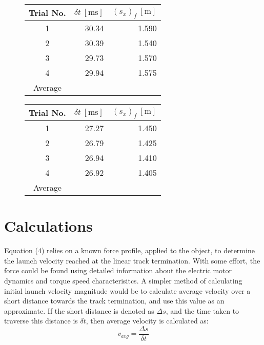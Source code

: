 \documentclass[a4paper]{article}
\begin{document}
\begin{figure}[h]
	\begin{minipage}{0.45\textwidth}
		\centering
		\begin{tabular}{crr}
			\toprule
			Trial No. & $\delta t \ [\si{\milli\second}]$ & $(s_x)_f \ [\si{\meter}]$\\
			\midrule
			1 & 30.34 & 1.590\\
			2 & 30.39 & 1.540\\
			3 & 29.73 & 1.570\\
			4 & 29.94 & 1.575\\
			\midrule
			Average & & \\
			\bottomrule
		\end{tabular}
	\end{minipage}
	\hspace{1cm}
	\begin{minipage}{0.45\textwidth}
		\centering
		\begin{tabular}{crr}
			\toprule
			Trial No. & $\delta t \ [\si{\milli\second}]$ & $(s_x)_f \ [\si{\meter}]$\\
			\midrule
			1 & 27.27 & 1.450\\
			2 & 26.79 & 1.425\\
			3 & 26.94 & 1.410\\
			4 & 26.92 & 1.405\\
			\midrule
			Average & & \\
			\bottomrule
		\end{tabular}
	\end{minipage}
\end{figure}

\newpage

\section{Calculations}
Equation (4) relies on a known force profile, applied to the object, to determine the launch velocity reached at the linear track termination. With some effort, the force could be found using detailed information about the electric motor dynamics and torque speed characterisitcs. A simpler method of calculating initial launch velocity magnitude would be to calculate average velocity over a short distance towards the track termination, and use this value as an approximate. If the short distance is denoted as $\Delta s$, and the time taken to traverse this distance is $\delta t$, then average velocity is calculated as:
\begin{equation}
v_{avg} = \frac{\Delta s}{\delta t}
\end{equation}
\end{document}
